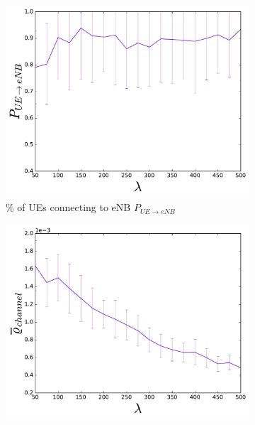 \begin{figure}[H]
  \begin{subfigure}[b]{0.5\linewidth}
    \centering
    \captionsetup{justification=centering}
    \includegraphics[width=1\linewidth]{figures/WARD_2} 
    \caption{\% of UEs connecting to eNB $P_{UE\rightarrow eNB}$ }
    \label{fig:WARD_2} 
    \vspace{4ex}
  \end{subfigure}%
  \begin{subfigure}[b]{0.5\linewidth}
    \centering
    \captionsetup{justification=centering}
    \includegraphics[width=1\linewidth]{figures/WARD_8} 

\end{subfigure}
\end{figure}

